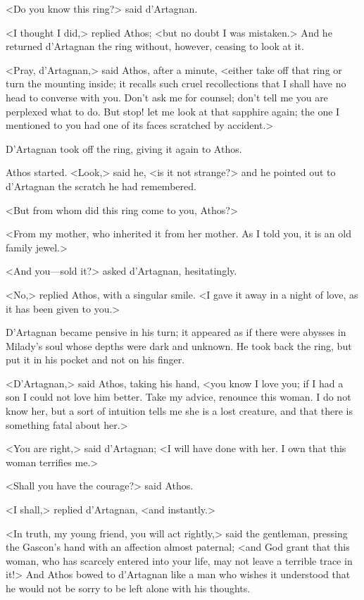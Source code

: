 <Do you know this ring?> said d'Artagnan. 

<I thought I did,> replied Athos; <but no doubt I was mistaken.> And he returned d'Artagnan the ring without, however, ceasing to look at it. 

<Pray, d'Artagnan,> said Athos, after a minute, <either take off that ring or turn the mounting inside; it recalls such cruel recollections that I shall have no head to converse with you. Don't ask me for counsel; don't tell me you are perplexed what to do. But stop! let me look at that sapphire again; the one I mentioned to you had one of its faces scratched by accident.> 

D'Artagnan took off the ring, giving it again to Athos. 

Athos started. <Look,> said he, <is it not strange?> and he pointed out to d'Artagnan the scratch he had remembered. 

<But from whom did this ring come to you, Athos?> 

<From my mother, who inherited it from her mother. As I told you, it is an old family jewel.> 

<And you---sold it?> asked d'Artagnan, hesitatingly. 

<No,> replied Athos, with a singular smile. <I gave it away in a night of love, as it has been given to you.> 

D'Artagnan became pensive in his turn; it appeared as if there were abysses in Milady's soul whose depths were dark and unknown. He took back the ring, but put it in his pocket and not on his finger. 

<D'Artagnan,> said Athos, taking his hand, <you know I love you; if I had a son I could not love him better. Take my advice, renounce this woman. I do not know her, but a sort of intuition tells me she is a lost creature, and that there is something fatal about her.> 

<You are right,> said d'Artagnan; <I will have done with her. I own that this woman terrifies me.> 

<Shall you have the courage?> said Athos. 

<I shall,> replied d'Artagnan, <and instantly.> 

<In truth, my young friend, you will act rightly,> said the gentleman, pressing the Gascon's hand with an affection almost paternal; <and God grant that this woman, who has scarcely entered into your life, may not leave a terrible trace in it!> And Athos bowed to d'Artagnan like a man who wishes it understood that he would not be sorry to be left alone with his thoughts. 

